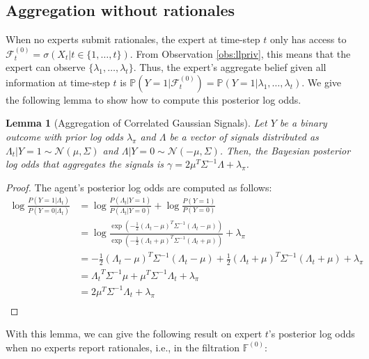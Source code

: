 \documentclass{winnower}
\newtheorem{lemma}{Lemma}
\begin{document}
\subsection{Aggregation without rationales}

When no experts submit rationales, the expert at time-step $t$ only has access to $\mathcal{F}_t^{(0)} = \sigma\left(X_t | t \in \{1,\ldots, t\}\right)$. From Observation \ref{obs:llpriv}, this means that the expert can observe $\{\lambda_1, \ldots, \lambda_{t}\}$. Thus, the expert's aggregate belief given all information at time-step $t$ is $\mathbb{P}(Y=1|\mathcal{F}_t^{(0)})  = \mathbb{P}(Y=1 | \lambda_1, \ldots, \lambda_t)$. We give the following lemma to show how to compute this posterior log odds.

\begin{lemma}[Aggregation of Correlated Gaussian Signals]\label{lem:agg}
    Let $Y$ be a binary outcome with prior log odds $\lambda_\pi$ and $\Lambda$ be a vector of signals distributed as $\Lambda_t|Y=1 \sim \mathcal{N}(\mu, \Sigma)$ and $\Lambda|Y=0 \sim \mathcal{N}(-\mu, \Sigma)$. Then, the Bayesian posterior log odds that aggregates the signals is $\gamma = 2\mu^T \Sigma^{-1} \Lambda + \lambda_\pi$.
\end{lemma}
\begin{proof} The agent's posterior log odds are computed as follows:
    \begin{equation}
    \begin{split}
        \log \frac{P(Y= 1| \Lambda_t)}{P(Y= 0|\Lambda_t)} &= \log \frac{P(\Lambda_t | Y=1)}{P(\Lambda_t|Y=0)} + \log \frac{P(Y=1)}{P(Y=0)} \\
         &= \log \frac{\exp{\left( -\frac12 ({\Lambda_t} - {\mu})^T\Sigma^{-1}({\Lambda_t}-{\mu})\right)}}{\exp{\left( -\frac12 ({\Lambda_t} + {\mu})^T\Sigma^{-1}({\Lambda_t}+ {\mu})\right)}} + \lambda_\pi \\
         &=  -\frac12 ({\Lambda_t} - {\mu})^T\Sigma^{-1}({\Lambda_t}-{\mu})  +\frac12 ({\Lambda_t} + {\mu})^T\Sigma^{-1}({\Lambda_t}+ {\mu}) + \lambda_\pi \\
         &=  {\Lambda_t}^T\Sigma^{-1} {\mu} + {\mu}^T\Sigma^{-1}{\Lambda_t} + \lambda_\pi \\
         &=  2{\mu}^T\Sigma^{-1}{\Lambda_t} + \lambda_\pi\\
    \end{split}
\end{equation}
\end{proof}


With this lemma, we can give the following result on expert $t$'s posterior log odds when no experts report rationales, i.e., in the filtration $\mathbb{F}^{(0)}$:
\end{document}
